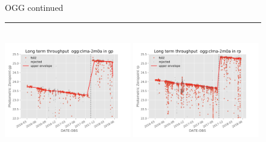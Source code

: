 \documentclass[]{spie}
\begin{document}
\begin{figure}\ContinuedFloat
\centering 
OGG continued \\ 
\rule{\textwidth}{0.4pt} \\
\includegraphics[width=0.49\textwidth]{images/photzptrend-ogg-clma-2m0a-gp.png} \hspace*{\fill}
\includegraphics[width=0.49\textwidth]{images/photzptrend-ogg-clma-2m0a-rp.png} \\[1ex]


\end{figure}
\end{document}
